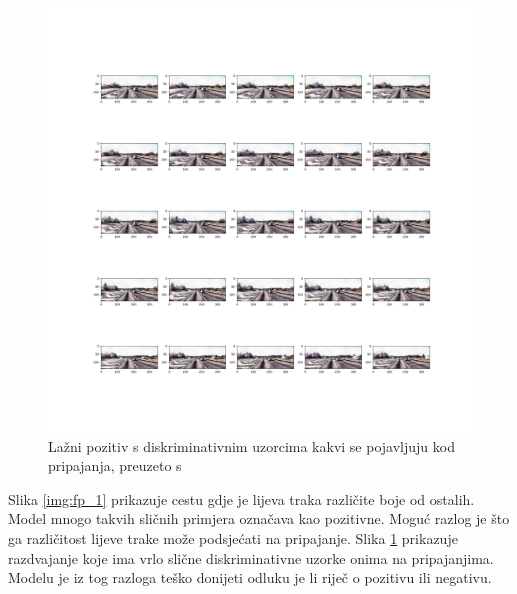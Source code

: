 \documentclass[times, utf8, diplomski, numeric]{fer}
\begin{document}
\begin{figure}[H]
\centering
\includegraphics[scale=0.3]{images/fp_2.png}
\caption{Lažni pozitiv s diskriminativnim uzorcima kakvi se pojavljuju kod pripajanja, preuzeto s \citep{url:ftts_irap}}
\label{img:fp_2}
\end{figure}

Slika \ref{img:fp_1} prikazuje cestu gdje je lijeva traka različite boje od ostalih. 
Model mnogo takvih sličnih primjera označava kao pozitivne. Moguć razlog je što ga različitost lijeve trake može podsjećati na pripajanje.
Slika \ref{img:fp_2} prikazuje razdvajanje koje ima vrlo slične diskriminativne uzorke onima na pripajanjima. 
Modelu je iz tog razloga teško donijeti odluku je li riječ o pozitivu ili negativu.
\end{document}
